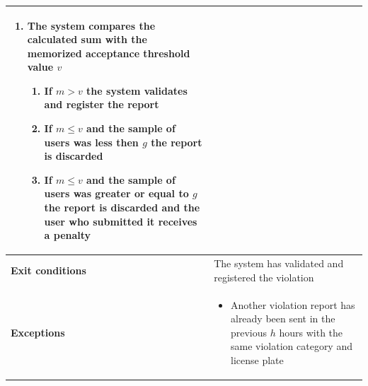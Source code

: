 \begin{description}
\begin{center}
\begin{tabular}{|p{3cm}|p{7cm}|}
\begin{enumerate}
                    \item The system compares the calculated sum with the memorized acceptance threshold value $v$
                    \begin{enumerate}
                        \item If $m > v$ the system validates and register the report
                        \item If $m \leq v$ and the sample of users was less then $g$ the report is discarded
                        \item If $m \leq v$ and the sample of users was greater or equal to $g$ the report is discarded and the user who submitted it receives a penalty
                    \end{enumerate}
                \end{enumerate} \\
                \hline
                \textbf{Exit conditions} & The system has validated and registered the violation \\
                \hline
                \textbf{Exceptions}
                & \begin{itemize}
                    \item Another violation report has already been sent in the previous $h$ hours with the same violation category and license plate
                \end{itemize} \\
                \hline
            \end{tabular}
        \end{center}
\end{description}

